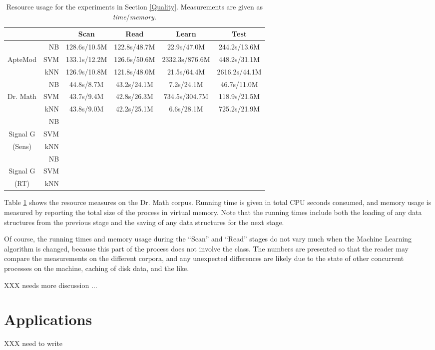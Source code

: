 \begin{table}
\begin{tabular}{|c|r|c c c c|}
\cline{3-6}
\multicolumn{2}{c|}{}
                 &     Scan     &    Read       &    Learn       &    Test       \\ \hline
           & NB  & 128.6s/10.5M & 122.8s/48.7M  &   22.9s/47.0M  &  244.2s/13.6M \\
ApteMod    & SVM & 133.1s/12.2M & 126.6s/50.6M  & 2332.3s/876.6M &  448.2s/31.1M \\
           & kNN & 126.9s/10.8M & 121.8s/48.0M  &   21.5s/64.4M  & 2616.2s/44.1M \\ \hline
           & NB  &  44.8s/8.7M  &  43.2s/24.1M  &    7.2s/24.1M  &   46.7s/11.0M \\
Dr. Math   & SVM &  43.7s/9.4M  &  42.8s/26.3M  &  734.5s/304.7M &  118.9s/21.5M \\
           & kNN &  43.8s/9.0M  &  42.2s/25.1M  &    6.6s/28.1M  &  725.2s/21.9M \\ \hline
           & NB  &   &   &   & \\
Signal G   & SVM &   &   &  &  \\
  (Sens)   & kNN &   &   &   & \\ \hline
           & NB  &   &   &   & \\
Signal G   & SVM &   &   &  &  \\
  (RT)     & kNN &   &   &   & \\ \hline
\end{tabular}
\caption{Resource usage for the experiments in Section \ref{Quality}.
  Measurements are given as \emph{time}/\emph{memory}.}
\label{efficiency-drmath}
\end{table}

Table \ref{efficiency-drmath} shows the resource measures on the
Dr. Math corpus.  Running time is given in total CPU seconds consumed,
and memory usage is measured by reporting the total size of the
process in virtual memory.  Note that the running times include both
the loading of any data structures from the previous stage and the
saving of any data structures for the next stage.

Of course, the running times and memory usage during the ``Scan'' and
``Read'' stages do not vary much when the Machine Learning algorithm
is changed, because this part of the process does not involve the
 class.  The numbers are presented so that the reader
may compare the measurements on the different corpora, and any
unexpected differences are likely due to the state of other concurrent
processes on the machine, caching of disk data, and the like.

XXX needs more discussion ...

\section{Applications}
\label{Applications}

XXX need to write